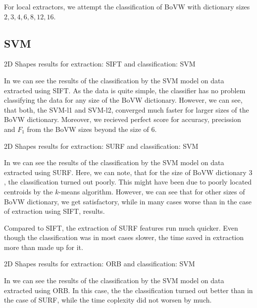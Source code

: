 For local extractors, we attempt the classification of BoVW with dictionary sizes $2, 3, 4, 6, 8, 12, 16$.

\subsection{SVM}
\begin{table}[h!]
    \centering
    
    \caption{2D Shapes results for extraction: SIFT and classification: SVM}
    \label{tab:2d_SIFT_SVM}
\end{table}
In  we can see the results of the classification by the SVM model on data extracted using SIFT. As the data is quite simple, the classifier has no problem classifying the data for any size of the BoVW dictionary. However, we can see, that both, the SVM-l1 and SVM-l2, converged much faster for larger sizes of the BoVW dictionary. Moreover, we recieved perfect score for accuracy, precission and $F_1$ from the BoVW sizes beyond the size of $6$.

\begin{table}[h!]
    \centering
    
    \caption{2D Shapes results for extraction: SURF and classification: SVM}
    \label{tab:2d_SURF_SVM}
\end{table}
In  we can see the results of the classification by the SVM model on data extracted using SURF. Here, we can note, that for the size of BoVW dictionary $3$, the classification turned out poorly. This might have been due to poorly located centroids by the $k$-means algorithm. However, we can see that for other sizes of BoVW dictionary, we get satisfactory, while in many cases worse than in the case of extraction using SIFT, results.

Compared to SIFT, the extraction of SURF features run much quicker. Even though the classification was in most cases slower, the time saved in extraction more than made up for it.

\begin{table}[h!]
    \centering
    
    \caption{2D Shapes results for extraction: ORB and classification: SVM}
    \label{tab:2d_ORB_SVM}
\end{table}
In  we can see the results of the classification by the SVM model on data extracted using ORB. In this case, the the classification turned out better than in the case of SURF, while the time coplexity did not worsen by much.

